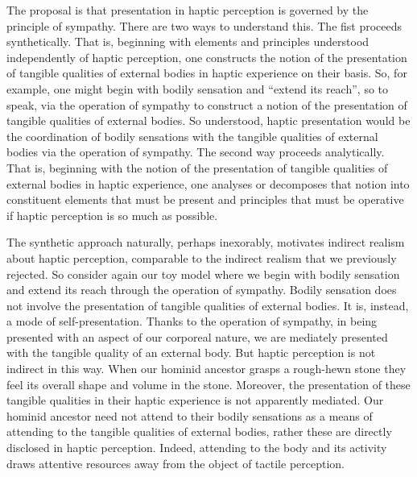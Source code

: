 The proposal is that presentation in haptic perception is governed by the principle of sympathy. There are two ways to understand this. The fist proceeds synthetically. That is, beginning with elements and principles understood independently of haptic perception, one constructs the notion of the presentation of tangible qualities of external bodies in haptic experience on their basis. So, for example, one might begin with bodily sensation and ``extend its reach'', so to speak, via the operation of sympathy to construct a notion of the presentation of tangible qualities of external bodies. So understood, haptic presentation would be the coordination of bodily sensations with the tangible qualities of external bodies via the operation of sympathy. The second way proceeds analytically. That is, beginning with the notion of the presentation of tangible qualities of external bodies in haptic experience, one analyses or decomposes that notion into constituent elements that must be present and principles that must be operative if haptic perception is so much as possible. 

The synthetic approach naturally, perhaps inexorably, motivates indirect realism about haptic perception, comparable to the indirect realism that we previously rejected. So consider again our toy model where we begin with bodily sensation and extend its reach through the operation of sympathy. Bodily sensation does not involve the presentation of tangible qualities of external bodies. It is, instead, a mode of self-presentation. Thanks to the operation of sympathy, in being presented with an aspect of our corporeal nature, we are mediately presented with the tangible quality of an external body. But haptic perception is not indirect in this way. When our hominid ancestor grasps a rough-hewn stone they feel its overall shape and volume in the stone. Moreover, the presentation of these tangible qualities in their haptic experience is not apparently mediated. Our hominid ancestor need not attend to their bodily sensations as a means of attending to the tangible qualities of external bodies, rather these are directly disclosed in haptic perception. Indeed, attending to the body and its activity draws attentive resources away from the object of tactile perception. 



